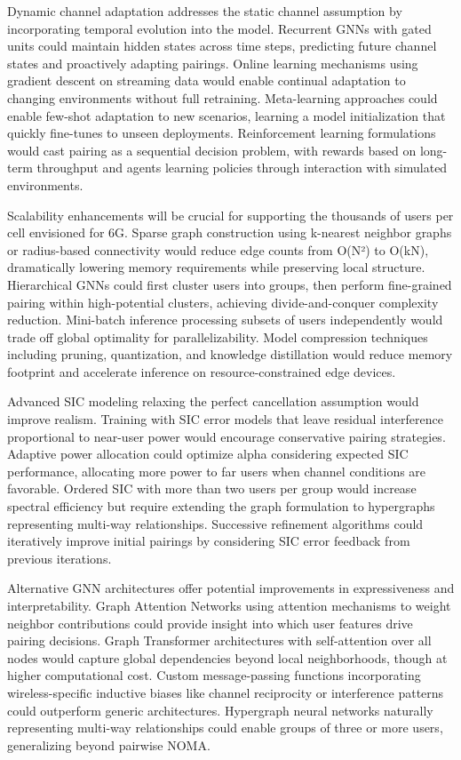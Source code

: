 Dynamic channel adaptation addresses the static channel assumption by incorporating temporal evolution into the model. Recurrent GNNs with gated units could maintain hidden states across time steps, predicting future channel states and proactively adapting pairings. Online learning mechanisms using gradient descent on streaming data would enable continual adaptation to changing environments without full retraining. Meta-learning approaches could enable few-shot adaptation to new scenarios, learning a model initialization that quickly fine-tunes to unseen deployments. Reinforcement learning formulations would cast pairing as a sequential decision problem, with rewards based on long-term throughput and agents learning policies through interaction with simulated environments.

Scalability enhancements will be crucial for supporting the thousands of users per cell envisioned for 6G. Sparse graph construction using k-nearest neighbor graphs or radius-based connectivity would reduce edge counts from O(N²) to O(kN), dramatically lowering memory requirements while preserving local structure. Hierarchical GNNs could first cluster users into groups, then perform fine-grained pairing within high-potential clusters, achieving divide-and-conquer complexity reduction. Mini-batch inference processing subsets of users independently would trade off global optimality for parallelizability. Model compression techniques including pruning, quantization, and knowledge distillation would reduce memory footprint and accelerate inference on resource-constrained edge devices.

Advanced SIC modeling relaxing the perfect cancellation assumption would improve realism. Training with SIC error models that leave residual interference proportional to near-user power would encourage conservative pairing strategies. Adaptive power allocation could optimize alpha considering expected SIC performance, allocating more power to far users when channel conditions are favorable. Ordered SIC with more than two users per group would increase spectral efficiency but require extending the graph formulation to hypergraphs representing multi-way relationships. Successive refinement algorithms could iteratively improve initial pairings by considering SIC error feedback from previous iterations.

Alternative GNN architectures offer potential improvements in expressiveness and interpretability. Graph Attention Networks using attention mechanisms to weight neighbor contributions could provide insight into which user features drive pairing decisions. Graph Transformer architectures with self-attention over all nodes would capture global dependencies beyond local neighborhoods, though at higher computational cost. Custom message-passing functions incorporating wireless-specific inductive biases like channel reciprocity or interference patterns could outperform generic architectures. Hypergraph neural networks naturally representing multi-way relationships could enable groups of three or more users, generalizing beyond pairwise NOMA.

